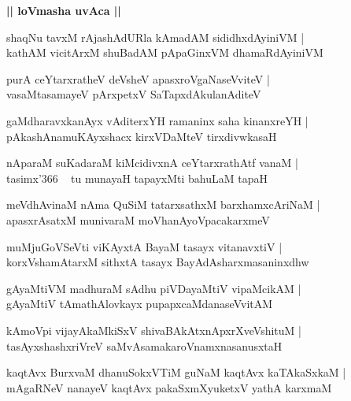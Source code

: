 \documentclass[twoside,12pt,openright]{book}
\newcounter{shloka}[chapter]
\def\uvaca#1{\centerline{{\large\textbf{#1}}}}
\begin{document}
\uvaca{|| loVmasha uvAca ||}

\begin{shloka}%
shaqNu tavxM rAjashAdURla kAmadAM sididhxdAyiniVM |\\
kathAM vicitArxM shuBadAM pApaGinxVM dhamaRdAyiniVM 
\end{shloka}

\begin{shloka}%
purA ceYtarxratheV deVsheV apasxroVgaNaseVviteV |\\
vasaMtasamayeV pArxpetxV SaTapxdAkulanAditeV 
\end{shloka}

\begin{shloka}%
gaMdharavxkanAyx vAditerxYH ramaninx saha kinanxreYH |\\
pAkashAnamuKAyxshacx kirxVDaMteV tirxdivwkasaH
\end{shloka}

\begin{shloka}%
nAparaM suKadaraM kiMcidivxnA ceYtarxrathAtf vanaM |\\
tasimx\char'366 ~ tu munayaH tapayxMti bahuLaM tapaH 
\end{shloka}

\begin{shloka}%
meVdhAvinaM nAma QuSiM tatarxsathxM barxhamxcAriNaM |\\
apasxrAsatxM munivaraM moVhanAyoVpacakarxmeV
\end{shloka}

\begin{shloka}%
muMjuGoVSeVti viKAyxtA BayaM tasayx vitanavxtiV |\\
korxVshamAtarxM sithxtA tasayx BayAdAsharxmasaninxdhw 
\end{shloka}

\begin{shloka}%
gAyaMtiVM madhuraM sAdhu piVDayaMtiV vipaMcikAM |\\
gAyaMtiV tAmathAlovkayx pupapxcaMdanaseVvitAM 
\end{shloka}

\begin{shloka}%
kAmoVpi vijayAkaMkiSxV shivaBAkAtxnApxrXveVshituM |\\
tasAyxshashxriVreV saMvAsamakaroVnamxnasanusxtaH
\end{shloka}

\begin{shloka}%
kaqtAvx BurxvaM dhanuSokxVTiM guNaM kaqtAvx kaTAkaSxkaM |\\
mAgaRNeV nanayeV kaqtAvx pakaSxmXyuketxV yathA karxmaM 
\end{shloka}
\end{document}
